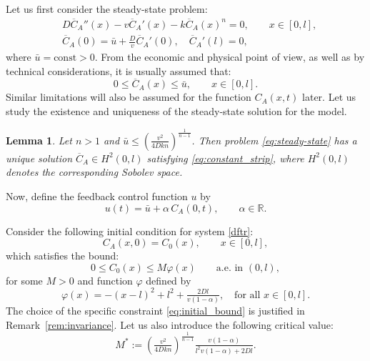 \documentclass{mpi2015-cscpreprint}
\newtheorem{lemma}[theorem]{Lemma}
\numberwithin{equation}{section}
\begin{document}
Let us first consider the steady-state problem:
\begin{equation}\label{eq:steady-state}
\begin{aligned}
    &D\overline{C}_A''(x) -v\overline{C}_A'(x) -k\overline{C}_A(x)^n=0, 
\qquad x\in[0,l],
\\ &\overline{C}_A(0)=\bar{u}+\tfrac{D}{v}\overline{C}_A'(0), \quad \overline{C}_A'(l)=0,
\end{aligned}
\end{equation}
where $\bar{u}=\text{const}>0$. From the economic and physical point of view, as well as by technical considerations, it is usually assumed that:
\begin{equation}\label{eq:constant_strip}
0\leqslant \overline{C}_A(x)\leqslant \bar{u}, \qquad x\in[0,l].
\end{equation}
Similar limitations will also be assumed for the function $C_A(x,t)$ later. Let us study the existence and uniqueness of the steady-state solution for the model.

\begin{lemma}\label{lem:steady-state}
Let $n>1$ and $\bar{u}\le\left(\frac{v^2}{4Dkn}\right)^\frac{1}{n-1}$. Then problem \eqref{eq:steady-state} has a unique solution $\overline{C}_A\in H^2(0,l)$ satisfying \eqref{eq:constant_strip}, where $H^2(0,l)$ denotes the corresponding Sobolev space.
\end{lemma}

Now, define the feedback control function $u$ by
\begin{equation}\label{control_1}
u(t)=\bar{u}+\alpha\,C_A(0,t), \qquad  \alpha\in\mathbb{R}.
\end{equation}

Consider the following initial condition for system \eqref{dftr}:
\begin{equation}\label{initial}
C_A(x,0)=C_0(x), \qquad  x\in [0,l],
\end{equation}
which satisfies the bound:
\begin{equation}\label{eq:initial_bound}
0\leqslant C_0(x)\leqslant M\varphi(x) \qquad\text{a.e. in }(0,l),
\end{equation}
for some $M>0$ and function $\varphi$ defined by
\begin{equation}\label{eq:phi}
\varphi(x)=-(x-l)^2+l^2+\tfrac{2Dl}{v(1-\alpha)}, \quad \text{for all }x\in[0,l].
\end{equation}
{ The choice of the specific constraint \eqref{eq:initial_bound} is justified in Remark~\ref{rem:invariance}.} Let us also introduce the following { critical} value:
\begin{equation}\label{eq:M*}
M^*:=\left(\tfrac{v^2}{4Dkn}\right)^\frac{1}{n-1}\tfrac{v(1-\alpha)}{l^2v(1-\alpha)+2Dl}.
\end{equation}
\end{document}
